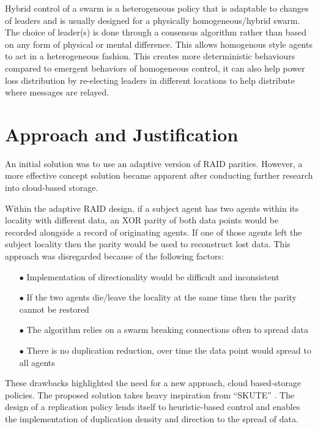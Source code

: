 \documentclass{UoYCSproject}
\begin{document}
Hybrid control of a swarm is a heterogeneous policy that is adaptable to changes of leaders and is usually designed for a physically homogeneous/hybrid swarm.
The choice of leader(s) is done through a consensus algorithm \cite{Paxos} rather than based on any form of physical or mental difference.
This allows homogenous style agents to act in a heterogeneous fashion.
This creates more deterministic behaviours compared to emergent behaviors of homogeneous control, it can also help power loss distribution by re-electing leaders in different locations to help distribute where messages are relayed.

\section{Approach and Justification}
\label{sec:Inital Soloution Ideas}

An initial solution was to use an adaptive version of RAID parities. However, a more effective concept solution became apparent after conducting further research into cloud-based storage.

Within the adaptive RAID design, if a subject agent has two agents within its locality with different data, an XOR parity of both data points would be recorded alongside a record of originating agents. If one of those agents left the subject locality then the parity would be used to reconstruct lost data. This approach was disregarded because of the following factors:

\begin{itemize}
\itemsep-1em
\item[$\bullet$] Implementation of directionality would be difficult and inconsistent
\item[$\bullet$] If the two agents die/leave the locality at the same time then the parity cannot be restored
\item[$\bullet$] The algorithm relies on a swarm breaking connections often to spread data
\item[$\bullet$] There is no duplication reduction, over time the data point would spread to all agents
\end{itemize}

These drawbacks highlighted the need for a new approach, cloud based-storage policies. The proposed solution takes heavy inspiration from “SKUTE” \cite{Distributed Storage}. The design of a replication policy lends itself to heuristic-based control and enables the implementation of duplication density and direction to the spread of data.
\end{document}
